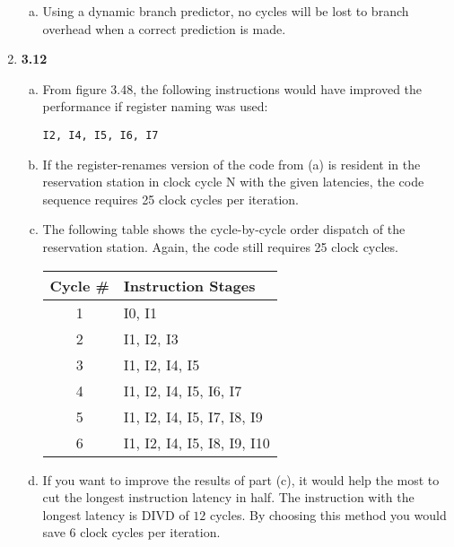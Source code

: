 \documentclass[10pt]{article} %
\begin{document}
\begin{enumerate}
\begin{enumerate}[(a)]
\item %

Using a dynamic branch predictor, no cycles will be lost to branch overhead when a correct prediction is made.  

\end{enumerate}

\item %

\textbf{3.12}

\begin{enumerate}[(a)]
\item %

From figure 3.48, the following instructions would have improved the performance if register naming was used: 
\begin{verbatim}I2, I4, I5, I6, I7\end{verbatim}

\item %

If the register-renames version of the code from (a) is resident in the reservation station in clock cycle N with the given latencies, the code sequence requires 25 clock cycles per iteration.  

\item %

The following table shows the cycle-by-cycle order dispatch of the reservation station.  Again, the code still requires 25 clock cycles.  

\begin{center}
\begin{tabular}{| c | l |}
\hline
Cycle \# & Instruction Stages \\
\hline
1 & I0, I1 \\
2 & I1, I2, I3 \\
3 & I1, I2, I4, I5 \\
4 & I1, I2, I4, I5, I6, I7 \\
5 & I1, I2, I4, I5, I7, I8, I9 \\
6 & I1, I2, I4, I5, I8, I9, I10 \\
\hline
\end{tabular}
\end{center}

\item %

If you want to improve the results of part (c), it would help the most to cut the longest instruction latency in half.  The instruction with the longest latency is DIVD of $12$ cycles.  By choosing this method you would save $6$ clock cycles per iteration.  

\end{enumerate}

\end{enumerate}
\end{document}
